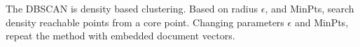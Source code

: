 The DBSCAN is density based clustering. Based on radius $\epsilon$, and MinPts, search density reachable points from a core point. Changing parameters $\epsilon$ and MinPts, repeat the method with embedded document vectors.
